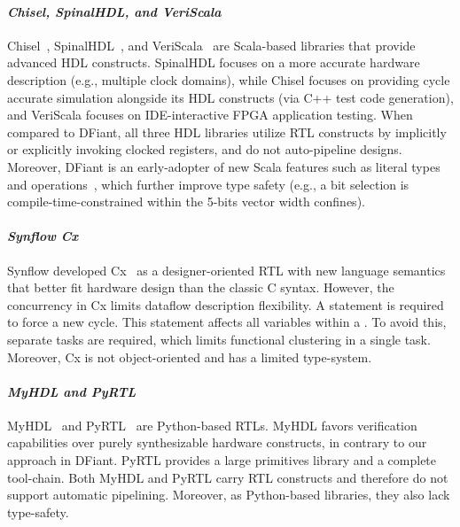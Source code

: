 \paragraph*{\bf \em Chisel, SpinalHDL, and VeriScala}
Chisel~\cite{Bachrach2012}, SpinalHDL~\cite{Charles2016}, and VeriScala~\cite{Liu2017} are Scala-based libraries that provide advanced HDL constructs. SpinalHDL focuses on a more accurate hardware description (e.g., multiple clock domains), while Chisel focuses on providing cycle accurate simulation alongside its HDL constructs (via C++ test code generation), and VeriScala focuses on IDE-interactive FPGA application testing. When compared to DFiant, all three HDL libraries utilize RTL constructs by implicitly or explicitly invoking clocked registers, and do not auto-pipeline designs. Moreover, DFiant is an early-adopter of new Scala features such as literal types~\cite{TypeLevelScala} and operations~\cite{singleton-ops}, which further improve type safety (e.g., a  bit selection is compile-time-constrained within the 5-bits vector width confines).


\paragraph*{\bf \em Synflow Cx} 
Synflow developed Cx~\cite{CxLang2014} as a designer-oriented RTL with new language semantics that better fit hardware design than the classic C syntax.
However, the concurrency in Cx limits dataflow description flexibility. A  statement is required to force a new cycle. This statement affects all variables within a . To avoid this, separate tasks are required, which limits functional clustering in a single task.
Moreover, Cx is not object-oriented and has a limited type-system.

\paragraph*{\bf \em MyHDL and PyRTL}
MyHDL~\cite{decaluwe2004myhdl} and PyRTL~\cite{Clow2017} are Python-based RTLs. MyHDL favors verification capabilities over purely synthesizable hardware constructs, in contrary to our approach in DFiant. PyRTL provides a large primitives library and a complete tool-chain. Both MyHDL and PyRTL carry RTL constructs and therefore do not support automatic pipelining. Moreover, as Python-based libraries, they also lack type-safety.

